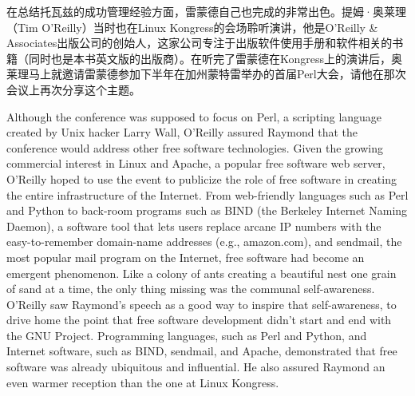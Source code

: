\ifdefined\chs
在总结托瓦兹的成功管理经验方面，雷蒙德自己也完成的非常出色。提姆·奥莱理（Tim O'Reilly）当时也在Linux Kongress的会场聆听演讲，他是O'Reilly \& Associates出版公司的创始人，这家公司专注于出版软件使用手册和软件相关的书籍（同时也是本书英文版的出版商）。在听完了雷蒙德在Kongress上的演讲后，奥莱理马上就邀请雷蒙德参加下半年在加州蒙特雷举办的首届Perl大会，请他在那次会议上再次分享这个主题。
\fi

\ifdefined\eng
Although the conference was supposed to focus on Perl, a scripting language created by Unix hacker Larry Wall, O'Reilly assured Raymond that the conference would address other free software technologies. Given the growing commercial interest in Linux and Apache, a popular free software web server, O'Reilly hoped to use the event to publicize the role of free software in creating the entire infrastructure of the Internet. From web-friendly languages such as Perl and Python to back-room programs such as BIND (the Berkeley Internet Naming Daemon), a software tool that lets users replace arcane IP numbers with the easy-to-remember domain-name addresses (e.g., amazon.com), and sendmail, the most popular mail program on the Internet, free software had become an emergent phenomenon. Like a colony of ants creating a beautiful nest one grain of sand at a time, the only thing missing was the communal self-awareness. O'Reilly saw Raymond's speech as a good way to inspire that self-awareness, to drive home the point that free software development didn't start and end with the GNU Project. Programming languages, such as Perl and Python, and Internet software, such as BIND, sendmail, and Apache, demonstrated that free software was already ubiquitous and influential. He also assured Raymond an even warmer reception than the one at Linux Kongress.
\fi

